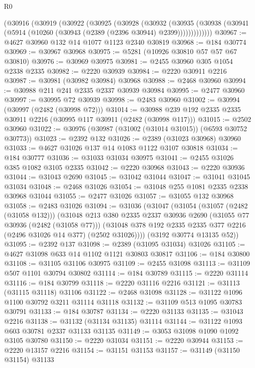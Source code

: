 \begin{lexlean}{R0}
\begin{coremodule}
    (@30916
      (@30919
        (@30922
          (@30925
            (@30928
              (@30932
                (@30935
                  (@30938 (@30941 (@5914 (@10260 (@30943 (@2389 (@2396 @30944) @2399)))))))))))))
@30967 := @4627 @30960 @132 @14 @1077 @1123 @2340 @30819
@30968 := @184 @30774
@30969 := @30967 @30968
@30975 := @5281 (@10926 @30810 @57 @57 @67 @30810)
@30976 := @30969 @30975
@30981 := @2455 @30960 @305 @1054 @2338 @2335
@30982 := @2220 @30939
@30984 := @2220 @30911 @2216
@30987 := @30981 (@30982 @30984) @30968
@30988 := @2468 @30960
@30994 := @30988 @211 @241 @2335 @2337 @30939 @30984
@30995 := @2477 @30960
@30997 := @30995 @72 @30939
@30998 := @2483 @30960
@31002 := @30994 (@30997 (@2482 (@30998 @72)))
@31014 := @30988 @239 @192 @2335 @2335 @30911 @2216 (@30995 @117 @30911 (@2482 (@30998 @117)))
@31015 := @2502 @30960
@31022 := @30976 (@30987 (@31002 (@31014 @31015)) (@6593 @30752 @30773))
@31023 := @2392 @132
@31026 := @2389 (@31023 @30968) @30960
@31033 := @4627 @31026 @137 @14 @1083 @1122 @3107 @30818
@31034 := @184 @30777
@31036 := @31033 @31034 @30975
@31041 := @2455 @31026 @385 @1082 @3105 @2335
@31042 := @2220 @30968
@31043 := @2220 @30936
@31044 := @31043 @2690
@31045 := @31042 @31044
@31047 := @31041 @31045 @31034
@31048 := @2468 @31026
@31054 := @31048 @255 @1081 @2335 @2338 @30968 @31044
@31055 := @2477 @31026
@31057 := @31055 @132 @30968
@31058 := @2483 @31026
@31094 := @31036
    (@31047
      (@31054
        (@31057 (@2482 (@31058 @132)))
        (@31048
          @213
          @380
          @2335
          @2337
          @30936
          @2690
          (@31055 @77 @30936 (@2482 (@31058 @77)))
          (@31048 @378 @192 @2335 @2335 @377 @2216 (@2496 @31026 @14 @377) (@2502 @31026))))
      (@3192 @30774 @13135 @52))
@31095 := @2392 @137
@31098 := @2389 (@31095 @31034) @31026
@31105 := @4627 @31098 @633 @14 @1102 @1121 @30803 @30817
@31106 := @184 @30800
@31108 := @31105 @31106 @30975
@31109 := @2455 @31098
@31113 := @31109 @507 @1101 @30794 @30802
@31114 := @184 @30789
@31115 := @2220 @31114
@31116 := @184 @30799
@31118 := @2220 @31116 @2216
@31121 := @31113 (@31115 @31118) @31106
@31122 := @2468 @31098
@31128 := @31122 @1096 @1100 @30792 @3211 @31114 @31118
@31132 := @31109 @513 @1095 @30783 @30791
@31133 := @184 @30787
@31134 := @2220 @31133
@31135 := @31043 @2216
@31138 := @31132 (@31134 @31135) @31114
@31144 := @31122 @1093 @603 @30781 @2337 @31133 @31135
@31149 := @3053 @31098 @1090 @1092 @3105 @30780
@31150 := @2220 @31034
@31151 := @2220 @30944
@31153 := @2220 @13157 @2216
@31154 := @31151 @31153
@31157 := @31149 (@31150 @31154) @31133

\end{coremodule}
\end{lexlean}
